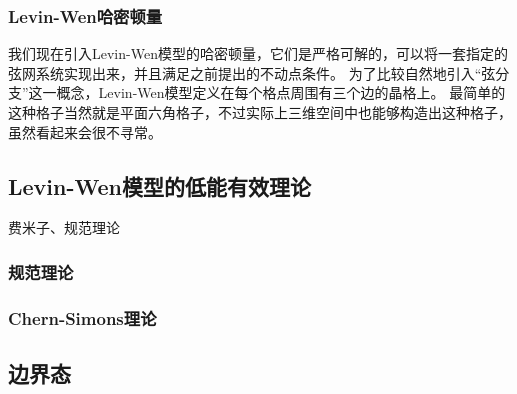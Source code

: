 \subsubsection{Levin-Wen哈密顿量}

我们现在引入Levin-Wen模型的哈密顿量，它们是严格可解的，可以将一套指定的弦网系统实现出来，并且满足之前提出的不动点条件。
为了比较自然地引入“弦分支”这一概念，Levin-Wen模型定义在每个格点周围有三个边的晶格上。
最简单的这种格子当然就是平面六角格子，不过实际上三维空间中也能够构造出这种格子，虽然看起来会很不寻常。


\subsection{Levin-Wen模型的低能有效理论}

费米子、规范理论

\subsubsection{规范理论}

\subsubsection{Chern-Simons理论}

\subsection{边界态}
